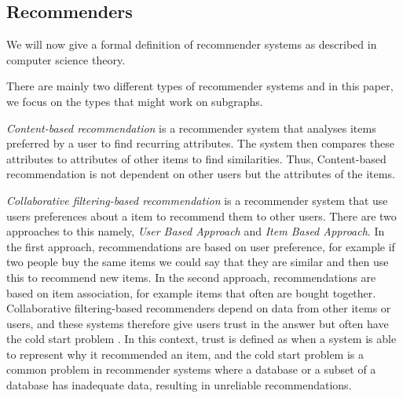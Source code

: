 \subsection{Recommenders}
\label{Subsec:recommenders}
We will now give a formal definition of recommender systems as described in computer science theory.

There are mainly two different  types of recommender systems and in this paper, we focus on the types that might work on subgraphs.

\textit{Content-based recommendation} is a recommender system that analyses items preferred by a user to find recurring attributes. The system then compares these attributes to attributes of other items to find similarities\cite{lu2015recommender}. Thus, Content-based recommendation is not dependent on other users but the attributes of the items.

\textit{Collaborative filtering-based recommendation} is a recommender system that use users preferences about a item to recommend them to other users. There are two approaches to this namely, \textit{User Based Approach} and \textit{Item Based Approach}. In the first approach, recommendations are based on user preference, for example if two people buy the same items we could say that they are similar and then use this to recommend new items. In the second approach, recommendations are based on item association, for example items that often are bought together.
Collaborative filtering-based recommenders depend on data from other items or users, and these systems therefore give users trust in the answer but often have the cold start problem \cite{lu2015recommender}. In this context, trust is defined as when a system is able to represent why it recommended an item, and the cold start problem is a common problem in recommender systems where a database or a subset of a database has inadequate data, resulting in unreliable recommendations\cite{Ricci2015}.
